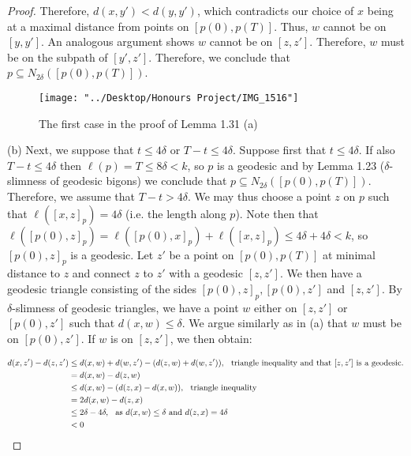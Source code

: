 \documentclass[12pt]{article}
\newcommand{\vs}{\vskip10pt}
\begin{document}
\begin{proof}
		Therefore, $d(x, y') < d(y,y')$, which contradicts our choice of $x$ being at a maximal distance from points on $[p(0), p(T)]$. Thus, $w$ cannot be on $[y, y']$. An analogous argument shows $w$ cannot be on $[z,z']$. Therefore, $w$ must be on the subpath of $[y', z']$. Therefore, we conclude that $p \subseteq N_{2 \delta}([p(0), p(T)])$. 
		
\begin{figure} [H]
	\centering
	\texttt{[image: "../Desktop/Honours Project/IMG\_1516"]}
	\caption{The first case in the proof of Lemma 1.31 (a)}
	\label{fig:img1516}
\end{figure}
		
		\vs 
		
		(b) Next, we suppose that $t \leq 4\delta$ or $T - t \leq 4 \delta$. Suppose first that $t \leq 4 \delta$. If also $T - t \leq 4 \delta$ then $\ell(p) = T \leq 8 \delta < k$, so $p$ is a geodesic and by Lemma 1.23 ($\delta$-slimness of geodesic bigons) we conclude that $p \subseteq N_{2 \delta} ([p(0), p(T)])$. Therefore, we assume that $T - t > 4 \delta$. We may thus choose a point $z$ on $p$ such that $\ell([x, z]_p) = 4 \delta$ (i.e. the length along $p$). Note then that $\ell([p(0), z]_p) = \ell([p(0), x]_p) + \ell([x, z]_p) \leq 4 \delta + 4 \delta < k$, so $[p(0), z]_p$ is a geodesic. Let $z'$ be a point on $[p(0), p(T)]$ at minimal distance to $z$ and connect $z$ to $z'$ with a geodesic $[z,z']$. We then have a geodesic triangle consisting of the sides $[p(0), z]_p, [p(0), z']$ and $[z, z']$. By $\delta$-slimness of geodesic triangles, we have a point $w$ either on $[z,z']$ or $[p(0), z']$ such that $d(x, w) \leq \delta$. We argue similarly as in (a) that $w$ must be on $[p(0), z']$. If $w$ is on $[z,z']$, we then obtain: 
		
		\begin{align*}
		d(x, z') - d(z, z') &\leq d(x,w) + d(w,z') - (d(z, w) + d(w, z')), \hspace{0.25cm} \text{triangle inequality and that } [z,z'] \text{ is a geodesic}. \\
		&= d(x,w) - d(z, w) \\
		&\leq d(x,w) - (d(z,x) - d(x,w)), \hspace{0.25cm} \text{triangle inequality} \\
		&= 2d(x,w) - d(z,x) \\
		&\leq 2 \delta - 4 \delta, \hspace{0.25cm} \text{as } d(x,w) \leq \delta \text{ and } d(z,x) = 4 \delta \\
		&< 0
		\end{align*} 
		

\end{proof}
\end{document}
